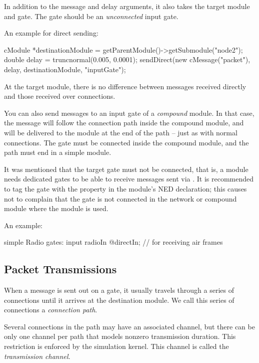 In addition to the message and delay arguments, it also takes the
target module and gate. The gate should be an \textit{unconnected}
input gate.

An example for direct sending:

\begin{cpp}
cModule *destinationModule = getParentModule()->getSubmodule("node2");
double delay = truncnormal(0.005, 0.0001);
sendDirect(new cMessage("packet"), delay, destinationModule, "inputGate");
\end{cpp}

At the target module, there is no difference between messages received
directly and those received over connections.

You can also send messages to an input gate of a \textit{compound} module.
In that case, the message will follow the connection path inside the
compound module, and will be delivered to the module at the end of the path
-- just as with normal connections. The gate must be connected inside the
compound module, and the path must end in a simple module.

It was mentioned that the target gate must not be connected, that is, a
module needs dedicated gates to be able to receive messages sent via
. It is recommended to tag the gate with the
 property in the module's NED declaration; this causes
{\opp} not to complain that the gate is not connected in the network or
compound module where the module is used.

An example:

\begin{ned}
simple Radio {
    gates:
        input radioIn @directIn; // for receiving air frames
}
\end{ned}


\subsection{Packet Transmissions}
\label{sec:simple-modules:packet-transmission}

When a message is sent out on a gate, it usually travels through
a series of connections until it arrives at the destination module.
We call this series of connections a \textit{connection path}.

Several connections in the path may have an associated channel,
but there can be only one channel per path that models nonzero
transmission duration. This restriction is enforced by the simulation
kernel. This channel is called the \textit{transmission channel}.


